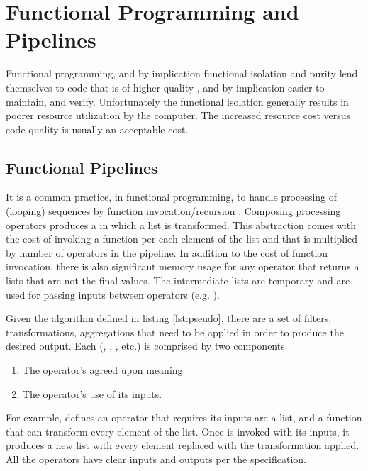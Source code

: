 \section{Functional Programming and Pipelines}
Functional programming, and by implication functional isolation and purity lend themselves to code that is of higher quality \cite{langstudy14}, and by implication easier to maintain, and verify. Unfortunately the functional isolation generally results in poorer resource utilization by the computer. The increased resource cost versus code quality is usually an acceptable cost.

\subsection{Functional Pipelines}
It is a common practice, in functional programming, to handle processing of (looping) sequences by function invocation/recursion \cite{recurse16}.  Composing processing operators produces a \pipeline in which a list is transformed.  This abstraction comes with the cost of invoking a function per each element of the list and that is multiplied by number of operators in the pipeline. In addition to the cost of function invocation, there is also significant memory usage for any operator that returns a lists that are not the final values. The intermediate lists are temporary and are used for passing inputs between operators (e.g. ).

\begin{minipage}{\linewidth}

\end{minipage} 

Given the algorithm defined in listing \ref{lst:pseudo}, there are a set of filters, transformations, aggregations that need to be applied in order to produce the desired output.  Each \pipelineoperator (, , , etc.) is comprised by two components.

\begin{enumerate} 
  \item The operator's agreed upon meaning.  
  \item The operator's use of its inputs.
\end{enumerate}

For example,  defines an operator that requires its inputs are a list, and a function that can transform every element of the list.  Once  is invoked with its inputs, it produces a new list with every element replaced with the transformation applied. All the operators have clear inputs and outputs per the \javascript specification. 

